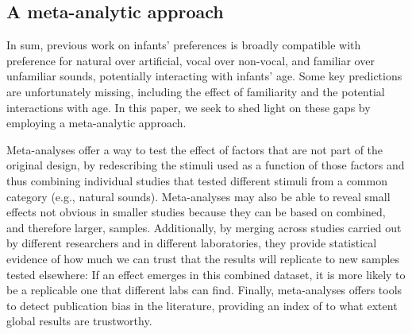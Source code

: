 \documentclass[]{apa6}
\begin{document}
\subsection{A meta-analytic approach}\label{a-meta-analytic-approach}

In sum, previous work on infants' preferences is broadly compatible with
preference for natural over artificial, vocal over non-vocal, and
familiar over unfamiliar sounds, potentially interacting with infants'
age. Some key predictions are unfortunately missing, including the
effect of familiarity and the potential interactions with age. In this
paper, we seek to shed light on these gaps by employing a meta-analytic
approach.

Meta-analyses offer a way to test the effect of factors that are not
part of the original design, by redescribing the stimuli used as a
function of those factors and thus combining individual studies that
tested different stimuli from a common category (e.g., natural sounds).
Meta-analyses may also be able to reveal small effects not obvious in
smaller studies because they can be based on combined, and therefore
larger, samples. Additionally, by merging across studies carried out by
different researchers and in different laboratories, they provide
statistical evidence of how much we can trust that the results will
replicate to new samples tested elsewhere: If an effect emerges in this
combined dataset, it is more likely to be a replicable one that
different labs can find. Finally, meta-analyses offers tools to detect
publication bias in the literature, providing an index of to what extent
global results are trustworthy.
\end{document}
